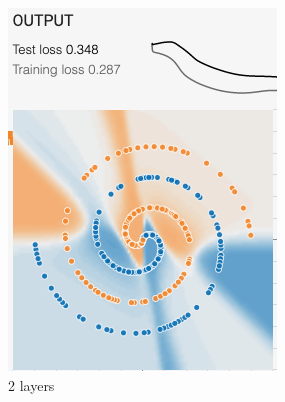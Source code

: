 \documentclass[12pt,a4paper]{article}
\begin{document}
\begin{enumerate}
\begin{figure}[H]
\begin{subfigure}[H]{0.2\textwidth}
				\includegraphics[width=\textwidth]{Figures/hidden/2}
				\caption{2 layers}
			\end{subfigure}
			\begin{subfigure}[H]{0.2\textwidth}
				\centering

\end{subfigure}
\end{figure}
\end{enumerate}
\end{document}
